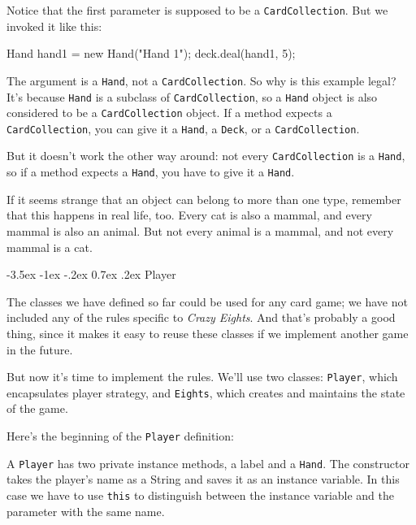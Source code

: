 \documentclass[12pt]{book}
\makeatletter
\theoremstyle{exercise}
\newcommand{\java}[1]{\verb"#1"}
\renewcommand{\section}{\@startsection{section}{1}{\z@}%
    {-3.5ex \@plus -1ex \@minus -.2ex}%
    {0.7ex \@plus.2ex}%
    {\normalfont\Large\bfseries}}
\newcommand{\java}[1]{\lstinline{#1}} %
\makeatother
\begin{document}
Notice that the first parameter is supposed to be a \java{CardCollection}.
But we invoked it like this:

\begin{code}
        Hand hand1 = new Hand("Hand 1");
        deck.deal(hand1, 5);
\end{code}

The argument is a \java{Hand}, not a \java{CardCollection}.
So why is this example legal?
It's because \java{Hand} is a subclass of \java{CardCollection}, so a \java{Hand} object is also considered to be a \java{CardCollection} object.
If a method expects a \java{CardCollection}, you can give it a \java{Hand}, a \java{Deck}, or a \java{CardCollection}.

But it doesn't work the other way around: not every \java{CardCollection} is a \java{Hand}, so if a method expects a \java{Hand}, you have to give it a \java{Hand}.

If it seems strange that an object can belong to more than one type, remember that this happens in real life, too.
Every cat is also a mammal, and every mammal is also an animal.
But not every animal is a mammal, and not every mammal is a cat.


\section{Player}

The classes we have defined so far could be used for any card game; we have not included any of the rules specific to {\em Crazy Eights}.
And that's probably a good thing, since it makes it easy to reuse these classes if we implement another game in the future.

But now it's time to implement the rules.
We'll use two classes: \java{Player}, which encapsulates player strategy, and \java{Eights}, which creates and maintains the state of the game.

Here's the beginning of the \java{Player} definition:

\begin{code}
public class Player {
    
    private String name;
    private Hand hand;
    
    public Player(String name) {
        this.name = name;
        this.hand = new Hand(name);
    }
\end{code}

A \java{Player} has two private instance methods, a label and a \java{Hand}.
The constructor takes the player's name as a String and saves it as an instance variable.
In this case we have to use \java{this} to distinguish between the instance variable and the parameter with the same name.
\end{document}
